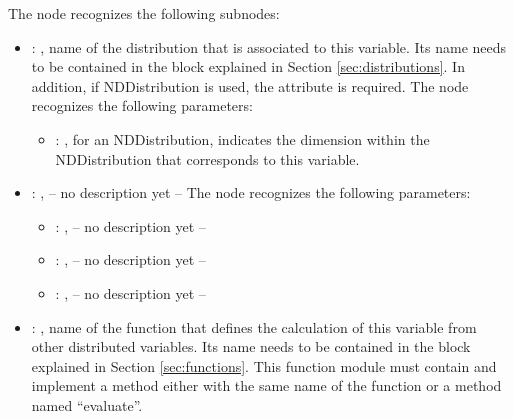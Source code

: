 \begin{itemize}
      The  node recognizes the following subnodes:
      \begin{itemize}
        \item {}: ,
          name of the distribution that is associated to this variable.               Its name needs
          to be contained in the  block explained               in Section
          \ref{sec:distributions}. In addition, if NDDistribution is used,               the
          attribute  is required. 
          The  node recognizes the following parameters:
            \begin{itemize}
              \item {}: ,
                for an NDDistribution, indicates the dimension within the NDDistribution that
                corresponds               to this variable.
          \end{itemize}

        \item {}: ,
          -- no description yet --
          The  node recognizes the following parameters:
            \begin{itemize}
              \item {}: ,
                -- no description yet --
              \item {}: ,
                -- no description yet --
              \item {}: ,
                -- no description yet --
          \end{itemize}

        \item {}: ,
          name of the function that               defines the calculation of this variable from
          other distributed variables.  Its name               needs to be contained in the
           block explained in Section               \ref{sec:functions}. This
          function module must contain and implement a method either with the same name of the
          function or a method named  ``evaluate''.               


\end{itemize}
\end{itemize}
